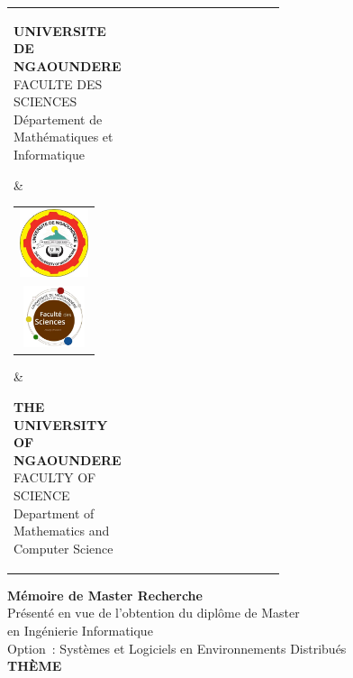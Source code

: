 \thispagestyle{empty}


\vspace*{0.3cm}

\vspace*{-4cm}
\begin{center}
	\setlength{\tabcolsep}{2pt}
	\begin{tabular}[t]{p{0.3\linewidth} c p{0.3\linewidth}}
		\parbox[t]{\linewidth}{
			\raggedright
			{\bfseries UNIVERSITE DE NGAOUNDERE} \newline
			FACULTE DES SCIENCES \newline
			Département de Mathématiques \newline
			et Informatique
		}
		 & 
		\begin{tabular}[t]{c}
			\includegraphics[height=2.0cm]{figures/univ_logo.jpeg} \\[0.2cm]
			\includegraphics[height=1.8cm]{figures/fac_logo.jpeg}
		\end{tabular}
		 & 
		\parbox[t]{\linewidth}{
			\raggedleft
			{\bfseries THE UNIVERSITY OF NGAOUNDERE} \newline
			FACULTY OF SCIENCE \newline
			Department of Mathematics \newline
			and Computer Science
		}
	\end{tabular}
\end{center}

\vspace{0.8cm}

\begin{center}
	{\bfseries\Large Mémoire de Master Recherche} \\[0.4cm]
	Présenté en vue de l'obtention du diplôme de Master \\
	en Ingénierie Informatique \\[0.35cm]
	Option~: Systèmes et Logiciels en Environnements Distribués \\[1cm]
	{\bfseries\large THÈME} \\[0.25cm]
\end{center}

